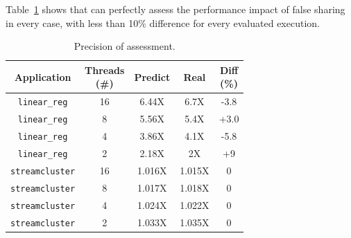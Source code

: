Table~\ref{tbl: precision} shows that \cheetah{} can perfectly assess the performance impact of false sharing in every case, with less than 10\% difference for every evaluated execution. %

\begin{table}
  \small
  \centering
  \caption{
    Precision of assessment.\label{tbl: precision}}
  \begin{tabular}{ c | c | c | c | c}
  \hline
  \textbf{Application} & \specialcell{Threads \\ (\#)} & \textbf{Predict} & \textbf{Real} & \specialcell{Diff \\ (\%)}\\ \hline
\texttt{linear\_reg} & 16 & 6.44X    & 6.7X & {-3.8}\\
\texttt{linear\_reg}& 8  & 5.56X    & 5.4X & {+3.0}\\
\texttt{linear\_reg} & 4  & 3.86X  & 4.1X  & {-5.8}\\
 \texttt{linear\_reg}& 2  & 2.18X  & 2X    & {+9}\\ \hline
 \texttt{streamcluster} & 16 & 1.016X    & 1.015X &  {0}\\
 \texttt{streamcluster} & 8 & 1.017X    & 1.018X & {0}\\
 \texttt{streamcluster} & 4 & 1.024X    & 1.022X & {0}\\
 \texttt{streamcluster} & 2 & 1.033X    & 1.035X & {0}\\
 \hline
\end{tabular}
  
\end{table}

